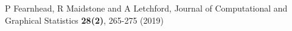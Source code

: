 \begin{thebibliography}{}

P Fearnhead, R Maidstone and A Letchford, Journal of Computational and Graphical Statistics \textbf{28(2)}, 265-275 (2019)

\end{thebibliography}
